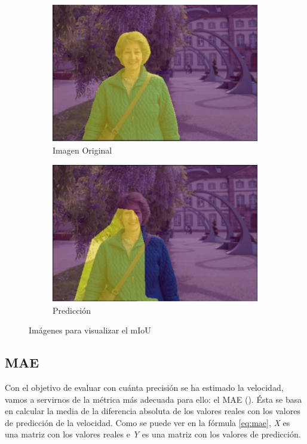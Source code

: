 \begin{figure}[H]
  \centering
  \begin{subfigure}[b]{0.45\linewidth}
    \includegraphics[width=\linewidth]{Figuras/Iou_1.eps}
    \caption{Imagen Original}
  \end{subfigure}
    \begin{subfigure}[b]{0.45\linewidth}
    \includegraphics[width=\linewidth]{Figuras/IoU_2.eps}
    \caption{Predicción}
  \end{subfigure}
  \caption{Imágenes para visualizar el \ac{mIoU}}
\end{figure}

\subsection{MAE}

Con el objetivo de evaluar con cuánta precisión se ha estimado la velocidad, vamos a servirnos de la métrica más adecuada para ello: el \ac{MAE} (\cite{mae}). Ésta se basa en calcular la media de la diferencia absoluta de los valores reales con los valores de predicción de la velocidad. Como se puede ver en la fórmula \ref{eq:mae}, \textit{X} es una matriz con los valores reales e \textit{Y} es una matriz con los valores de predicción.

